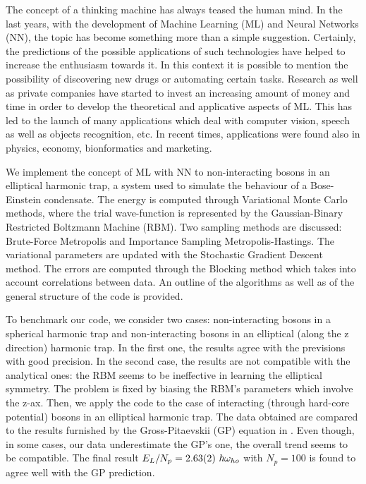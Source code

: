 The concept of a thinking machine has always teased the human mind. In the last years, with the development of Machine Learning (ML) and Neural Networks (NN), the topic has become something more than a simple suggestion. Certainly, the  predictions of the possible applications of such technologies have helped to increase the enthusiasm towards it. In this context it is possible to mention the possibility of discovering new drugs or automating certain tasks.
Research as well as private companies have started to invest an increasing amount of money and time in order to develop the theoretical and applicative aspects of ML. This has led to the launch of many applications which deal with computer vision, speech as well as objects recognition, etc. In recent times, applications were found also in physics, economy, bionformatics and marketing.


We implement the concept of ML with NN to non-interacting bosons in an elliptical harmonic trap, a system used to simulate the behaviour of a Bose-Einstein condensate. The energy is computed through Variational Monte Carlo methods, where the trial wave-function is represented by the Gaussian-Binary Restricted Boltzmann Machine (RBM). Two sampling methods are discussed: Brute-Force Metropolis and Importance Sampling Metropolis-Hastings. The variational parameters are updated with the Stochastic Gradient Descent method. The errors are computed through the Blocking method which takes into account correlations between data. An outline of the algorithms as well as of the general structure of the code is provided. 

To benchmark our code, we consider two cases: non-interacting bosons in a spherical harmonic trap and non-interacting bosons in an elliptical (along the z direction) harmonic trap. In the first one, the results agree with the previsions with good precision. In the second case, the results are not compatible with the analytical ones: the RBM seems to be ineffective in learning the elliptical symmetry. The problem is fixed by biasing the RBM's parameters which involve the z-ax. Then, we apply the code to the case of interacting (through hard-core potential) bosons in an elliptical harmonic trap. The data obtained are compared to the results furnished by the Gross-Pitaevskii (GP) equation in \cite{DalfString}. Even though, in some cases, our data underestimate the GP's one, the overall trend seems to be compatible. The final result $E_L/N_p=\SI{2.63\pm 0.02}{}\ \hbar \omega_{ho}$ with $N_p=100$ is found to agree well with the GP prediction.
 
 


